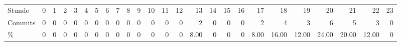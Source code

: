 \begin{tabular}{lD{.}{,}{1}D{.}{,}{1}D{.}{,}{1}D{.}{,}{1}D{.}{,}{1}D{.}{,}{1}D{.}{,}{1}D{.}{,}{1}D{.}{,}{1}D{.}{,}{1}D{.}{,}{1}D{.}{,}{1}D{.}{,}{1}D{.}{,}{1}D{.}{,}{1}D{.}{,}{1}D{.}{,}{1}D{.}{,}{1}D{.}{,}{1}D{.}{,}{1}D{.}{,}{1}D{.}{,}{1}D{.}{,}{1}D{.}{,}{1}}
	Stunde & 0 & 1 & 2 & 3 & 4 & 5 & 6 & 7 & 8 & 9 & 10 & 11 & 12 & 13 & 14 & 15 & 16 & 17 & 18 & 19 & 20 & 21 & 22 & 23 \\
	Commits & 0 & 0 & 0 & 0 & 0 & 0 & 0 & 0 & 0 & 0 & 0 & 0 & 0 & \textcolor{green!33.33!red}{2} & 0 & 0 & 0 & \textcolor{green!33.33!red}{2} & \textcolor{green!66.67!red}{4} & \textcolor{green!50.00!red}{3} & \textcolor{green!100.00!red}{6} & \textcolor{green!83.33!red}{5} & \textcolor{green!50.00!red}{3} & 0 \\
	\% & 0 & 0 & 0 & 0 & 0 & 0 & 0 & 0 & 0 & 0 & 0 & 0 & 0 & \color{green!33.33!red} 8.00 & 0 & 0 & 0 & \color{green!33.33!red} 8.00 & \color{green!66.67!red} 16.00 & \color{green!50.00!red} 12.00 & \color{green!100.00!red} 24.00 & \color{green!83.33!red} 20.00 & \color{green!50.00!red} 12.00 & 0 \\
\end{tabular}